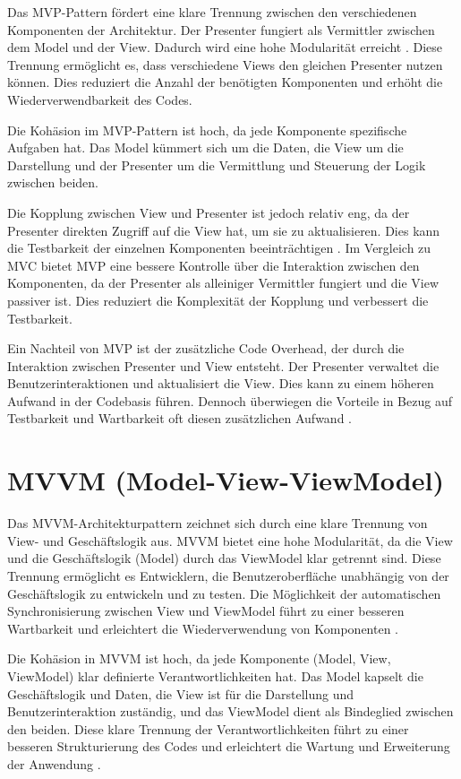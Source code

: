 Das \ac{MVP}-Pattern fördert eine klare Trennung zwischen den verschiedenen Komponenten der Architektur. Der Presenter fungiert als Vermittler zwischen dem Model und der View. Dadurch wird eine hohe Modularität erreicht \cite{qureshi2024}. Diese Trennung ermöglicht es, dass verschiedene Views den gleichen Presenter nutzen können. Dies reduziert die Anzahl der benötigten Komponenten und erhöht die Wiederverwendbarkeit des Codes.

Die Kohäsion im \ac{MVP}-Pattern ist hoch, da jede Komponente spezifische Aufgaben hat. Das Model kümmert sich um die Daten, die View um die Darstellung und der Presenter um die Vermittlung und Steuerung der Logik zwischen beiden. 

Die Kopplung zwischen View und Presenter ist jedoch relativ eng, da der Presenter direkten Zugriff auf die View hat, um sie zu aktualisieren. Dies kann die Testbarkeit der einzelnen Komponenten beeinträchtigen \cite{aihara2012mvc}. Im Vergleich zu \ac{MVC} bietet \ac{MVP} eine bessere Kontrolle über die Interaktion zwischen den Komponenten, da der Presenter als alleiniger Vermittler fungiert und die View passiver ist. Dies reduziert die Komplexität der Kopplung und verbessert die Testbarkeit.

Ein Nachteil von \ac{MVP} ist der zusätzliche Code Overhead, der durch die Interaktion zwischen Presenter und View entsteht. Der Presenter verwaltet die Benutzerinteraktionen und aktualisiert die View. Dies kann zu einem höheren Aufwand in der Codebasis führen. Dennoch überwiegen die Vorteile in Bezug auf Testbarkeit und Wartbarkeit oft diesen zusätzlichen Aufwand \cite{qureshi2024}.

\section{MVVM (Model-View-ViewModel)}

Das \ac{MVVM}-Architekturpattern zeichnet sich durch eine klare Trennung von View- und Geschäftslogik aus. \ac{MVVM} bietet eine hohe Modularität, da die View und die Geschäftslogik (Model) durch das ViewModel klar getrennt sind. Diese Trennung ermöglicht es Entwicklern, die Benutzeroberfläche unabhängig von der Geschäftslogik zu entwickeln und zu testen. Die Möglichkeit der automatischen Synchronisierung zwischen View und ViewModel führt zu einer besseren Wartbarkeit und erleichtert die Wiederverwendung von Komponenten \cite{arcos2018comparative}.

Die Kohäsion in \ac{MVVM} ist hoch, da jede Komponente (Model, View, ViewModel) klar definierte Verantwortlichkeiten hat. Das Model kapselt die Geschäftslogik und Daten, die View ist für die Darstellung und Benutzerinteraktion zuständig, und das ViewModel dient als Bindeglied zwischen den beiden. Diese klare Trennung der Verantwortlichkeiten führt zu einer besseren Strukturierung des Codes und erleichtert die Wartung und Erweiterung der Anwendung \cite{arcos2018comparative}.


